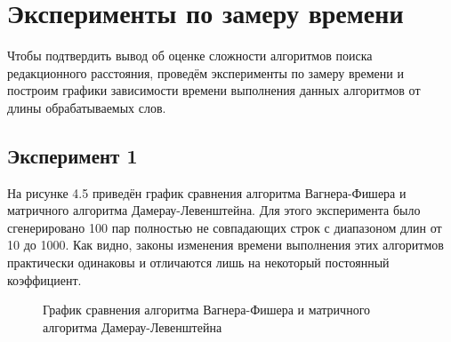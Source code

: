 \section{Эксперименты по замеру времени}
Чтобы подтвердить вывод об оценке сложности алгоритмов поиска редакционного расстояния, проведём эксперименты по замеру времени и построим графики зависимости времени выполнения данных алгоритмов от длины обрабатываемых слов.

\subsection{Эксперимент 1}
На рисунке 4.5 приведён график сравнения алгоритма Вагнера-Фишера и матричного алгоритма Дамерау-Левенштейна. Для этого эксперимента было сгенерировано 100 пар полностью не совпадающих строк с диапазоном длин от 10 до 1000. Как видно, законы изменения времени выполнения этих алгоритмов практически одинаковы и отличаются лишь на некоторый постоянный коэффициент.
\begin{figure}[H]
    \centering
    \caption{График сравнения алгоритма Вагнера-Фишера и матричного алгоритма Дамерау-Левенштейна}
\end{figure}

